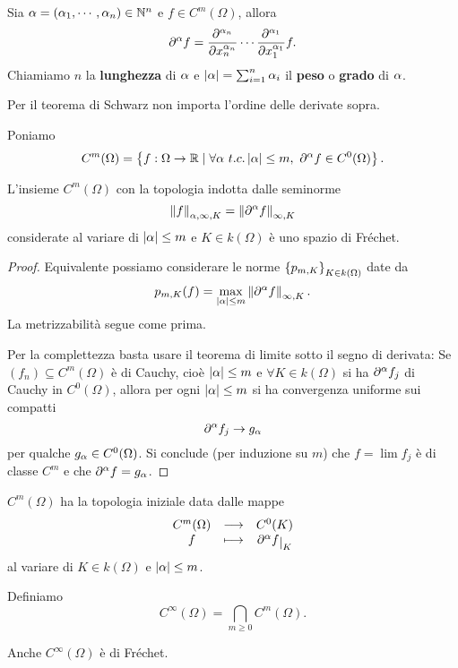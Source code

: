 \begin{notation}
Sia $\alpha=(\alpha_1,\cdots, \alpha_n)\in \mathbb{N}^n$ e $f\in C^m(\Omega)$, allora
\[\del^\al f=\pp[\al_n]{x_n^{\al_n}}{}\cdots \pp[\al_1]{x_1^{\al_1}}{} f.\]
Chiamiamo $n$ la \textbf{lunghezza} di $\alpha$ e $\left|{\alpha}\right|=\sum_{i=1}^n\alpha_i$ il \textbf{peso} o \textbf{grado} di $\alpha$.
\end{notation}

\begin{remark}
Per il teorema di Schwarz non importa l'ordine delle derivate sopra.
\end{remark}

\begin{definition}
Poniamo
\[C^m(\Omega)=\left\{{f:\Omega\to \mathbb{R}\mid\forall \alpha\ t.c. \left|{\alpha}\right|\leq m,\  \partial^\alpha f\in C^0(\Omega)}\right\}.\]
\end{definition}

\begin{proposition}\label{Pr-mRegolariSonoSpazioFrechet}
L'insieme $C^m(\Omega)$ con la topologia indotta dalle seminorme
\[\left\Vert{f}\right\Vert_{\alpha,\infty,K}=\left\Vert{\partial^\alpha f}\right\Vert_{\infty,K}\]
considerate al variare di $\left|{\alpha}\right|\leq m$ e $K\in k(\Omega)$ \`e uno spazio di Fr\'echet.
\end{proposition}
\begin{proof}
Equivalente possiamo considerare le norme $\left\{{p_{m,K}}\right\}_{K\in k(\Omega)}$ date da
\[p_{m,K}(f)=\max_{\left|{\alpha}\right|\leq m}\left\Vert{\partial^\alpha f}\right\Vert_{\infty,K}.\]
La metrizzabilit\`a segue come prima.
\medskip

Per la complettezza basta usare il teorema di limite sotto il segno di derivata: Se $(f_n)\subseteq C^m(\Omega)$ \`e di Cauchy, cio\`e $\left|{\alpha}\right|\leq m$ e $\forall K\in k(\Omega)$ si ha $\partial^\alpha f_j$ di Cauchy in $C^0(\Omega)$, allora per ogni $\left|{\alpha}\right|\leq m$ si ha convergenza uniforme sui compatti
\[\partial^\alpha f_j\to g_\alpha\]
per qualche $g_\alpha\in C^0(\Omega)$. Si conclude (per induzione su $m$) che $f=\lim f_j$ \`e di classe $C^m$ e che $\partial^\alpha f=g_\alpha$.
\end{proof}

\begin{remark}
$C^m(\Omega)$ ha la topologia iniziale data dalle mappe
\[\funcDef{C^m(\Omega)}{C^0(K)}{f}{\del^\al f\res K}\]
al variare di $K\in k(\Omega)$ e $\left|{\alpha}\right|\leq m$.
\end{remark}

\begin{definition}
Definiamo 
\[C^\infty(\Omega)=\bigcap_{m\geq 0}C^m(\Omega).\]
\end{definition}
\begin{remark}
Anche $C^\infty(\Omega)$ \`e di Fr\'echet.
\end{remark}


